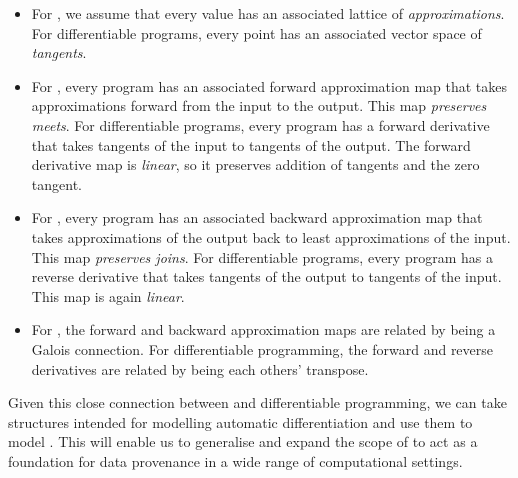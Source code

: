 \begin{itemize}
\item For \GPS, we assume that every value has an associated lattice of {\em approximations}. For differentiable programs, every point has an associated vector space of {\em tangents}.
\item For \GPS, every program has an associated forward approximation map that takes approximations forward from the input to the output. This map {\em preserves meets}. For differentiable programs, every program has a forward derivative that takes tangents of the input to tangents of the output. The forward derivative map is {\em linear}, so it preserves addition of tangents and the zero tangent.
\item For \GPS, every program has an associated backward approximation map that takes approximations of the output back to least approximations of the input. This map {\em preserves joins}. For differentiable programs, every program has a reverse derivative that takes tangents of the output to tangents of the input. This map is again {\em linear}.
\item For \GPS, the forward and backward approximation maps are related by being a Galois connection. For differentiable programming, the forward and reverse derivatives are related by being each others' transpose.
\end{itemize}


Given this close connection between \GPS and differentiable programming, we can take structures intended for modelling automatic differentiation and use them to model \GPS. This will enable us to generalise and expand the scope of \GPS to act as a foundation for data provenance in a wide range of computational settings.
